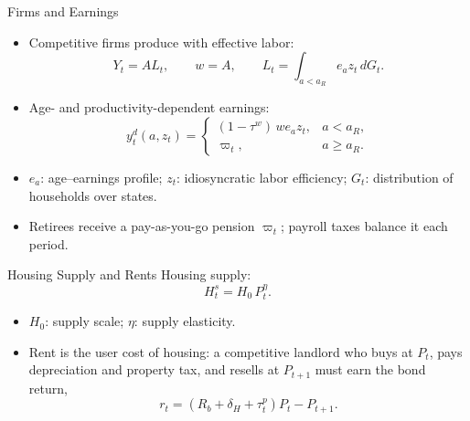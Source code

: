 \begin{frame}{Firms and Earnings}
\small
\begin{itemize}
  \item Competitive firms produce with effective labor:
  \[
  Y_t=A L_t,\qquad w=A,\qquad L_t=\int_{a<a_R} e_a z_t\,dG_t.
  \]
  \item Age- and productivity-dependent earnings:
  \[
  y_t^d(a,z_t)=\begin{cases}
  (1-\tau^{w})\,w e_a z_t,&a<a_R,\\
  \varpi_t,&a\geq a_R.
  \end{cases}
  \]
  \item $e_a$: age--earnings profile; $z_t$: idiosyncratic labor efficiency; $G_t$: distribution of households over states.
  \item Retirees receive a pay-as-you-go pension $\varpi_t$; payroll taxes balance it each period.
\end{itemize}
\end{frame}

\begin{frame}{Housing Supply and Rents}
\small
Housing supply:
\[
H_t^s=H_0\,P_t^{\eta}.
\]
\begin{itemize}
  \item $H_0$: supply scale; $\eta$: supply elasticity.
  \item Rent is the user cost of housing: a competitive landlord who buys at $P_t$, pays depreciation and property tax, and resells at $P_{t+1}$ must earn the bond return,
  \[
  r_t=(R_b+\delta_H+\tau_t^p)P_t-P_{t+1}.
  \]
\end{itemize}
\end{frame}


